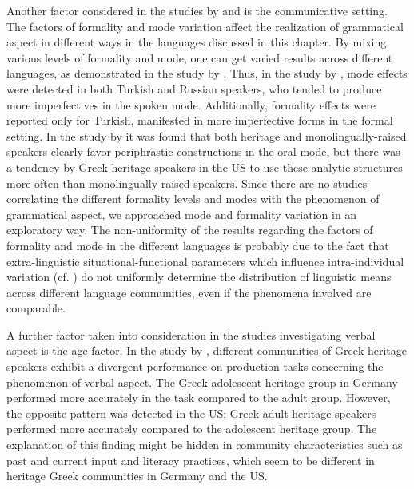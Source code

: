 \documentclass[output=paper,colorlinks,citecolor=brown]{langscibook}
\begin{document}
Another factor considered in the studies by \textcite{RizouEtAl} and \textcite{alexiadou2022use} is the communicative setting. The factors of formality and mode variation affect the realization of grammatical aspect in different ways in the languages discussed in this chapter. By mixing various levels of formality and mode, one can get varied results across different languages, as demonstrated in the study by \textcite{pescuma2023situating}. Thus, in the study by \textcite{RizouEtAl}, mode effects were detected in both Turkish and Russian speakers, who tended to produce more imperfectives in the spoken mode. Additionally, formality effects were reported only for Turkish, manifested in more imperfective forms in the formal setting. In the study by \textcite{alexiadou2022use} it was found that both heritage and monolingually-raised speakers clearly favor periphrastic constructions in the oral mode, but there was a tendency by Greek heritage speakers in the US to use these analytic structures more often than monolingually-raised speakers. Since there are no studies correlating the different formality levels and modes with the phenomenon of grammatical aspect, we approached mode and formality variation in an exploratory way. The non-uniformity of the results regarding the factors of formality and mode in the different languages is probably due to the fact that extra-linguistic situational-functional parameters which influence intra-individual variation (cf. \cite{ludeling2022register}) do not uniformly determine the distribution of linguistic means across different language communities, even if the phenomena involved are comparable.

A further factor taken into consideration in the studies investigating verbal aspect is the age factor. In the study by \textcite{rizou2021verbal}, different communities of Greek heritage speakers exhibit a divergent performance on production tasks concerning the phenomenon of verbal aspect. The Greek adolescent heritage group in Germany performed more accurately in the task compared to the adult group. However, the opposite pattern was detected in the US: Greek adult heritage speakers performed more accurately compared to the adolescent heritage group. The explanation of this finding might be hidden in community characteristics such as past and current input and literacy practices, which seem to be different in heritage Greek communities in Germany and the US.  
\end{document}
